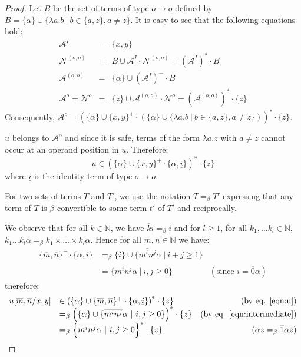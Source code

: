 \documentclass{llncs}
\newcommand{\encode}[1]{\overline{#1}} \newcommand\dps{\displaystyle}
\newcommand\union{\cup}
\newcommand\nat{\mathbb{N}}
\begin{document}
\begin{proof}
Let $B$ be the set of terms of type $o\rightarrow o$ defined by $B = \{ \alpha \} \union \{ \lambda a.b \ | \ b \in \{a,z\}, a \neq z \}$.
It is easy to see that the following equations hold:
\begin{eqnarray*}
\mathcal{A}^I &=& \{ x,y \} \\
\mathcal{N}^{(o,o)} &=& B \union \mathcal{A}^I \cdot
\mathcal{N}^{(o,o)} = (\mathcal{A}^I)^* \cdot B \\
\mathcal{A}^{(o,o)} &=& \{ \alpha \} \union (\mathcal{A}^I)^+ \cdot B \\
\mathcal{A}^o = \mathcal{N}^o &=& \{ z \} \union \mathcal{A}^{(o,o)} \cdot \mathcal{N}^o = (\mathcal{A}^{(o,o)})^* \cdot \{ z \}
\end{eqnarray*}
Consequently, $\mathcal{A}^o = \left( \{\alpha \} \union \{x,y\}^+ \cdot \left( \{\alpha \} \union \{\lambda a.b \ | \ b \in \{a,z\}, a \neq z \} \right) \right)^* \cdot \{ z \}$.

$u$ belongs to $\mathcal{A}^o$ and since it is safe,
terms of the form $\lambda a . z$ with $a \neq z$ cannot occur at an operand position in $u$. Therefore:
\begin{equation}
u \in \left( \{\alpha\} \union \{x,y\}^+ \cdot \{\alpha,
\underline{i} \} \right)^* \cdot \{ z \} \label{eqn:u}
\end{equation}
where $\underline{i}$ is the identity term of type $o\rightarrow o$.

For two sets of terms $T$ and $T'$, we use the notation $T =_\beta T'$ expressing that any term of $T$ is $\beta$-convertible to some term $t'$ of $T'$ and reciprocally.

We observe that for all $k \in \nat$, we have $\encode{k} \underline{i} =_\beta \underline{i}$ and for $l\geq 1$, for all $k_1, \ldots k_l \in \nat$, 
$\encode{k_1}\ldots \encode{k_l} \alpha =_\beta
\encode{k_1\times \ldots \times k_l} \alpha$. Hence for all $m,n \in \nat$ we have:
\begin{equation}
\begin{array}{llr}
\{\encode{m},\encode{n}\}^+ \cdot \{\alpha, \underline{i} \} &=_\beta
\{ \underline{i} \} \union
\{ \encode{m^i n^j} \alpha \ |\ i+j \geq 1 \} \nonumber \\
&= \{ \encode{m^i n^j} \alpha \ |\ i,j \geq 0 \} & ( \mbox{since } \underline{i} = \encode{0} \alpha) %
\end{array} 
\label{eqn:intermediate}
\end{equation}
therefore:
$$\begin{array}{llr}
u[\encode{m}, \encode{n}/x,y] &\in \left( \{ \alpha \} \union \{\encode{m},\encode{n}\}^+ \cdot \{\alpha, \underline{i} \} \right)^* \cdot \{ z \}  & \mbox{(by eq. \ref{eqn:u})} \\
&=_\beta \left( \{\alpha \} \union \{ \encode{m^i n^j}
\alpha \ | \ i,j \geq 0 \} \right)^* \cdot \{ z \} & \mbox{(by eq. \ref{eqn:intermediate})}  \\
&=_\beta \left\{ \encode{m^i n^j}
\alpha \ | \ i,j \geq 0 \right\}^* \cdot \{ z \} & \mbox{($\alpha z =_\beta \encode{1} \alpha z$)}
\end{array}$$


\end{proof}
\end{document}

